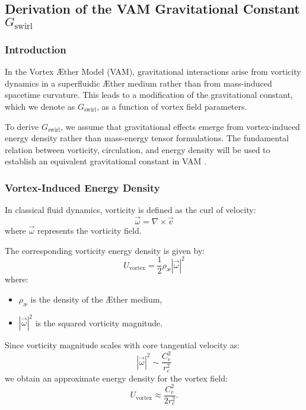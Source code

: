 
\subsection{Derivation of the VAM Gravitational Constant \(  G_\text{swirl} \)}

\subsubsection*{Introduction}
In the Vortex Æther Model (VAM), gravitational interactions arise from vorticity dynamics in a superfluidic Æther medium rather than from mass-induced spacetime curvature. This leads to a modification of the gravitational constant, which we denote as \(  G_\text{swirl} \), as a function of vortex field parameters.

To derive \(  G_\text{swirl} \), we assume that gravitational effects emerge from vortex-induced energy density rather than mass-energy tensor formulations. The fundamental relation between vorticity, circulation, and energy density will be used to establish an equivalent gravitational constant in VAM \cite{onsager_superfluid, barcelo_superfluid, moffatt_helicity}.

\subsubsection*{Vortex-Induced Energy Density}
In classical fluid dynamics, vorticity is defined as the curl of velocity:
\begin{equation*}
    \vec{\omega} = \nabla \times \vec{v}
\end{equation*}
where \( \vec{\omega} \) represents the vorticity field.

The corresponding vorticity energy density is given by:
\begin{equation*}
    U_{\text{vortex}} = \frac{1}{2} \rho_\text{\ae} |\vec{\omega}|^2
\end{equation*}
where:
\begin{itemize}
    \item \( \rho_\text{\ae} \) is the density of the Æther medium,
    \item \( |\vec{\omega}|^2 \) is the squared vorticity magnitude.
\end{itemize}

Since vorticity magnitude scales with core tangential velocity as:
\begin{equation*}
    |\vec{\omega}|^2 \sim \frac{C_e^2}{r_c^2}
\end{equation*}
we obtain an approximate energy density for the vortex field:
\begin{equation*}
    U_{\text{vortex}} \approx \frac{C_e^2}{2 r_c^2}.
\end{equation*}

